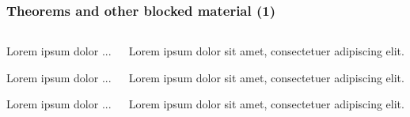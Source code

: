 \documentclass[aspectratio=1610]{beamer}
\begin{document}
\begin{frame}[fragile]
  \frametitle{Theorems and other blocked material (1)}
  \begin{columns}[onlytextwidth]
    \begin{column}{0.45\textwidth}
\begin{CodeBox}{}
\begin{definition}[def]
  Lorem ipsum dolor ...
\end{definition}
\end{CodeBox}

\begin{CodeBox}{}
\begin{theorem}[theorem]
  Lorem ipsum dolor ...
\end{theorem}
\end{CodeBox}

\begin{CodeBox}{}
\begin{example}[example]
  Lorem ipsum dolor ...
\end{example}
\end{CodeBox}
    \end{column}\textwidth%
    \begin{column}{0.5\textwidth}
  \begin{definition}[def]
    Lorem ipsum dolor sit amet, consectetuer adipiscing elit. 
  \end{definition}
  \begin{theorem}[theorem]
    Lorem ipsum dolor sit amet, consectetuer adipiscing elit. 
  \end{theorem}
  \begin{example}[example]
    Lorem ipsum dolor sit amet, consectetuer adipiscing elit. 
  \end{example}
    \end{column}
  \end{columns}
\end{frame}
\end{document}
